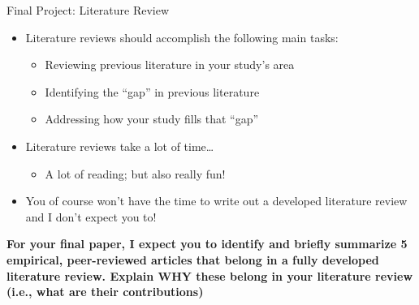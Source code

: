 \documentclass[
  8pt,
  ignorenonframetext,
  dvipsnames]{beamer}
\providecommand{\tightlist}{%
  \setlength{\itemsep}{0pt}\setlength{\parskip}{0pt}}
\renewcommand{\textbf}[1]{{\color{darkgray}\bfseries\fontfamily{Montserrat-TOsF}#1}}
\let\olditem\item
\renewcommand{\item}{%
  \olditem\vspace{4pt}
}
\begin{document}
\begin{frame}{Final Project: Literature Review}
\protect\hypertarget{final-project-literature-review}{}

\begin{itemize}
\tightlist
\item
  Literature reviews should accomplish the following main tasks:

  \begin{itemize}
  \tightlist
  \item
    Reviewing previous literature in your study's area
  \item
    Identifying the ``gap'' in previous literature
  \item
    Addressing how your study fills that ``gap''
  \end{itemize}
\item
  Literature reviews take a lot of time\ldots{}

  \begin{itemize}
  \tightlist
  \item
    A lot of reading; but also really fun!
  \end{itemize}
\item
  You of course won't have the time to write out a developed literature
  review and I don't expect you to!
\end{itemize}

\medskip

\textbf{For your final paper, I expect you to identify and briefly
summarize 5 empirical, peer-reviewed articles that belong in a fully
developed literature review. Explain WHY these belong in your literature
review (i.e., what are their contributions)}

\end{frame}
\end{document}
